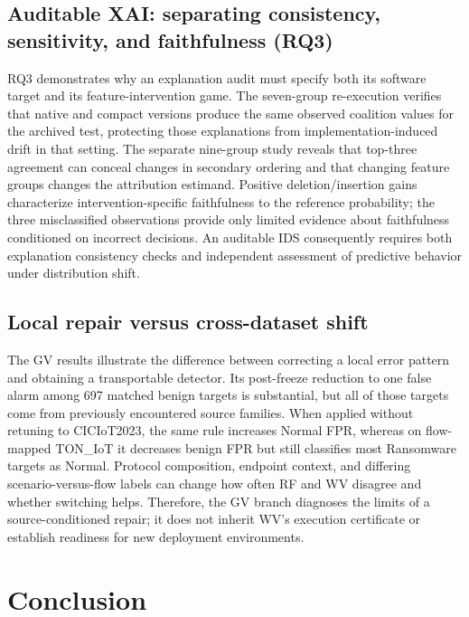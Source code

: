 \documentclass[final,3p,10pt,nopreprintline]{elsarticle}
\begin{document}
\subsection{Auditable XAI: separating consistency, sensitivity, and faithfulness (RQ3)}

RQ3 demonstrates why an explanation audit must specify both its software target and its feature-intervention game. The seven-group re-execution verifies that native and compact versions produce the same observed coalition values for the archived test, protecting those explanations from implementation-induced drift in that setting. The separate nine-group study reveals that top-three agreement can conceal changes in secondary ordering and that changing feature groups changes the attribution estimand. Positive deletion/insertion gains characterize intervention-specific faithfulness to the reference probability; the three misclassified observations provide only limited evidence about faithfulness conditioned on incorrect decisions. An auditable IDS consequently requires both explanation consistency checks and independent assessment of predictive behavior under distribution shift.

\subsection{Local repair versus cross-dataset shift}

The GV results illustrate the difference between correcting a local error pattern and obtaining a transportable detector. Its post-freeze reduction to one false alarm among 697 matched benign targets is substantial, but all of those targets come from previously encountered source families. When applied without retuning to CICIoT2023, the same rule increases Normal FPR, whereas on flow-mapped TON\_IoT it decreases benign FPR but still classifies most Ransomware targets as Normal. Protocol composition, endpoint context, and differing scenario-versus-flow labels can change how often RF and WV disagree and whether switching helps. Therefore, the GV branch diagnoses the limits of a source-conditioned repair; it does not inherit WV's execution certificate or establish readiness for new deployment environments.

\section{Conclusion}
\end{document}
